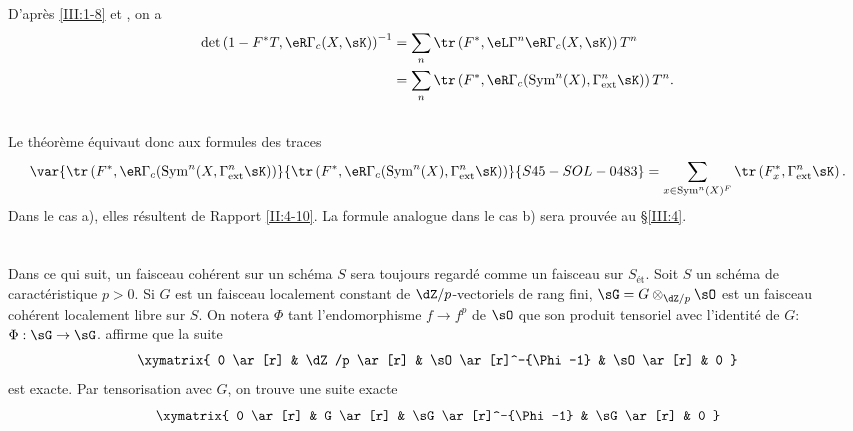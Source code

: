 D'après \ref{III:1-8} et \cite[XVII 5.5.21]{sga4}, on a 
\begin{align*}
  \det\left(1-F^* T,\eR\Gamma_c(X,\sK)\right)^{-1} 
    &= \sum_n \tr\left(F^*,\eL\Gamma^n\eR\Gamma_c(X,\sK)\right) T^n \\
    &= \sum_n \tr\left(F^*,\eR\Gamma_c(\operatorname{Sym}^n(X),\Gamma_\text{ext}^n\sK)\right) T^n \text{.}
\end{align*}





\subsection{}\label{III:2-13}

Le théorème équivaut donc aux formules des traces 
\[
  \var{\tr\left(F^*,\eR\Gamma_c(\operatorname{Sym}^n(X,\Gamma_\text{ext}^n \sK)\right)}{\tr\left(F^*,\eR\Gamma_c(\operatorname{Sym}^n(X),\Gamma_\text{ext}^n \sK)\right)}{S45-SOL-0483} = \sum_{x\in\operatorname{Sym}^n(X)^F} \tr\left(F_x^*,\Gamma_\text{ext}^n\sK\right) \text{.}
\]
Dans le cas a), elles résultent de Rapport \ref{II:4-10}. La formule 
analogue dans le cas b) sera prouvée au \S\ref{III:4}. 










\section{}\label{III:3}





\subsection{}\label{III:3-1}

Dans ce qui suit, un faisceau cohérent sur un schéma $S$ sera toujours 
regardé comme un faisceau sur $S_\text{ét}$. Soit $S$ un schéma de 
caractéristique $p>0$. Si $G$ est un faisceau localement constant de 
$\dZ/p$-vectoriels de rang fini, $\sG=G\otimes_{\dZ/p}\sO$ est un faisceau 
cohérent localement libre sur $S$. On notera $\Phi$ tant l'endomorphisme 
$f\to f^p$ de $\sO$ que son produit tensoriel avec l'identité de 
$G$: $\Phi:\sG\to\sG$.  \cite[IX 3.5]{sga4} 
affirme que la suite 
\[\xymatrix{
  0 \ar[r] 
    & \dZ/p \ar[r] 
    & \sO \ar[r]^-{\Phi-1} 
    & \sO \ar[r] 
    & 0
}\]
est exacte. Par tensorisation avec $G$, on trouve une suite exacte 
\[\xymatrix{
  0 \ar[r] 
    & G \ar[r] 
    & \sG \ar[r]^-{\Phi-1} 
    & \sG \ar[r] 
    & 0
}\]





